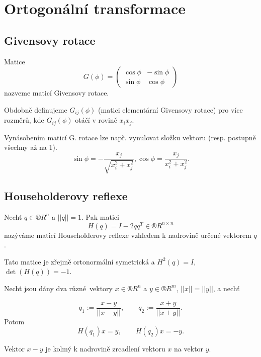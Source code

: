 \documentclass[12pt]{article}					%
\begin{document}
\section{Ortogonální transformace}
	\subsection{Givensovy rotace}
	\begin{definice}
		Matice
		$$ G(\phi) = \begin{pmatrix} \cos \phi & -\sin \phi \\ \sin \phi & \cos \phi \end{pmatrix} $$
		nazveme maticí Givensovy rotace.

		Obdobně definujeme $G_{ij}(\phi)$ (matici elementární Givensovy rotace) pro více rozměrů, kde $G_{ij}(\phi)$ otáčí v rovině $x_ix_j$.
	\end{definice}

	\begin{poznamka}
		Vynásobením maticí G. rotace lze např. vynulovat složku vektoru (resp. postupně všechny až na 1).
		$$ \sin\phi = -\frac{x_j}{\sqrt{x_i^2 + x_j^2}}, \cos\phi = \frac{x_j}{x_i^2 + x_j^2}. $$
	\end{poznamka}

	\subsection{Householderovy reflexe}
	\begin{definice}
		Nechť $q \in ®R^n$ a $||q|| = 1$. Pak matici
		$$ H(q) = I - 2qq^T \in ®R^{n \times n} $$
		nazýváme maticí Householderovy reflexe vzhledem k nadrovině určené vektorem $q$.

		\begin{poznamkain}
			Tato matice je zřejmě ortonormální symetrická a $H^2(q) = I$, $\det(H(q)) = -1$.
		\end{poznamkain}
	\end{definice}

	\begin{veta}[O zrcadlení]
		Nechť jsou dány dva různé vektory $x \in ®R^n$ a $y \in ®R^m$, $||x|| = ||y||$, a nechť

		$$ q_1 := \frac{x - y}{||x - y||}, \qquad q_2 := \frac{x + y}{||x + y||}. $$
		Potom
		$$ H(q_1)x = y, \qquad H(q_2)x = -y. $$

		\begin{dukazin}
			Vektor $x - y$ je kolmý k nadrovině zrcadlení vektoru $x$ na vektor $y$.
		\end{dukazin}
	\end{veta}
\end{document}

